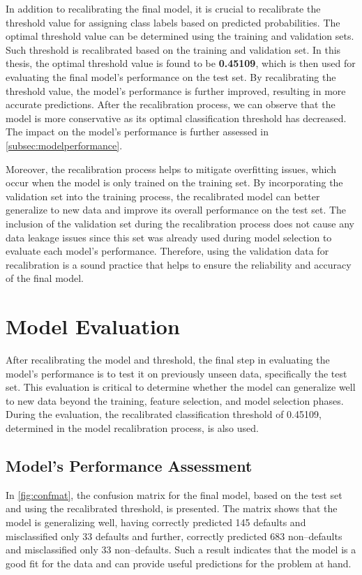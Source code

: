 In addition to recalibrating the final model, it is crucial to recalibrate the threshold value for assigning class labels based on predicted probabilities. The optimal threshold value can be determined using the training and validation sets. Such threshold is recalibrated based on the training and validation set.
In this thesis, the optimal threshold value is found to be \textbf{0.45109}, which is then used for evaluating the final model's performance on the test set.
By recalibrating the threshold value, the model's performance is further improved, resulting in more accurate predictions. After the recalibration process, we can observe that the model is more conservative as its optimal classification threshold has decreased. The impact on the model's performance is further assessed in \autoref{subsec:modelperformance}.

Moreover, the recalibration process helps to mitigate overfitting issues, which occur when the model is only trained on the training set.
By incorporating the validation set into the training process, the recalibrated model can better generalize to new data and improve its overall performance on the test set.
The inclusion of the validation set during the recalibration process does not cause any data leakage issues since this set was already used during model selection to evaluate each model's performance.
Therefore, using the validation data for recalibration is a sound practice that helps to ensure the reliability and accuracy of the final model.

\newpage
\section{Model Evaluation}
After recalibrating the model and threshold, the final step in evaluating the model's performance is to test it on previously unseen data, specifically the test set.
This evaluation is critical to determine whether the model can generalize well to new data beyond the training, feature selection, and model selection phases.
During the evaluation, the recalibrated classification threshold of 0.45109, determined in the model recalibration process, is also used.
\subsection{Model's Performance Assessment}
\label{subsec:modelperformance}



In \autoref{fig:confmat}, the confusion matrix for the final model, based on the test set and using the recalibrated threshold, is presented. The matrix shows that the model is generalizing well, having correctly predicted 145 defaults and misclassified only 33 defaults and further, correctly predicted 683 non--defaults and misclassified only 33 non--defaults. Such a result indicates that the model is a good fit for the data and can provide useful predictions for the problem at hand.

